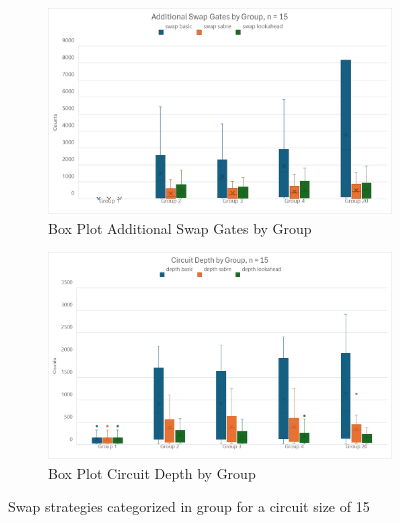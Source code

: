 \begin{figure}[htb]
    \centering
    \begin{subfigure}{0.48\linewidth}
        \includegraphics[width=\linewidth]{image/chart_box_plot_group.png}
        \caption{Box Plot Additional Swap Gates by Group}
        \label{fig:chart-box-plot-group}
    \end{subfigure}
    \begin{subfigure}{0.48\linewidth}
        \includegraphics[width=\linewidth]{image/chart_box_plot_group_depth.png}
        \caption{Box Plot Circuit Depth by Group}
        \label{fig:chart-box-plot-group-depth}
    \end{subfigure}
    \caption{Swap strategies categorized in group for a circuit size of 15}
    \label{fig:chart-box-plot-group-all}
\end{figure}
